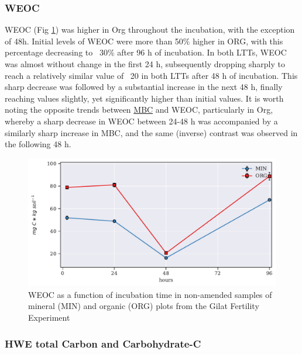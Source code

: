         \subsubsection{WEOC}
            WEOC  (Fig \ref{fig:weoc_control_preliminary}) was higher in Org throughout the incubation, with the exception of 48h. Initial levels of WEOC were more than 50$\%$ higher in ORG, with this percentage decreasing to ~30$\%$ after 96 h of incubation. In both LTTs, WEOC was almost without change in the first 24 h, subsequently dropping sharply to reach a relatively similar value of ~20 \genericunit in both LTTs after 48 h of incubation. This sharp decrease was followed by a substantial increase in the next 48 h, finally reaching values  slightly, yet significantly higher than initial values. It is worth noting the opposite trends between \hyperref[fig:mbc_control_main]{MBC} and WEOC, particularly in  Org, whereby  a sharp decrease in WEOC between 24-48 h was accompanied by a similarly sharp increase in MBC, and the same (inverse) contrast was observed in the following 48 h.

            \begin{figure}[H]
            \centering
            \includegraphics[scale=0.8]{thesis_figures/preliminary/control/WEOC.pdf}
            \caption{WEOC  as a function of incubation time in non-amended samples  of mineral (MIN) and organic (ORG) plots from the Gilat Fertility Experiment}
            \label{fig:weoc_control_preliminary}
             \end{figure}


       	\subsubsection{HWE total Carbon and Carbohydrate-C}

